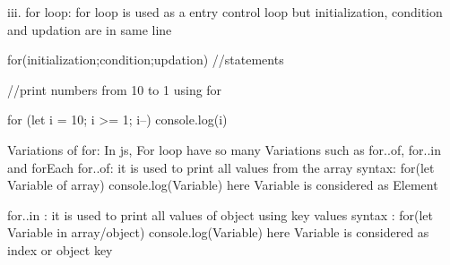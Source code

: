iii. for loop:  for loop is used as a entry control loop but initialization, condition and updation are in same line

for(initialization;condition;updation){
  //statements
}

//print numbers from 10 to 1 using for

for (let i = 10; i >= 1; i--)
{
    console.log(i)
}

Variations of for:
  In js, For loop have so many Variations such as for..of, for..in and forEach
for..of: it is used to print all values from the array
syntax: for(let Variable of array){
  console.log(Variable)
}
here Variable is considered as Element 

for..in : it is used to print all values of object using key values
syntax : for(let Variable in array/object){
  console.log(Variable)
}
here Variable is considered as index or object key